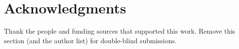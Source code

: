 \section*{Acknowledgments}
\label{sec:ack}

Thank the people and funding sources that supported this work. Remove this section (and the author list) for double-blind submissions.
